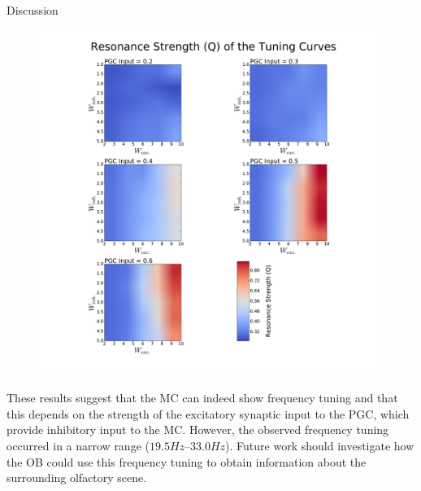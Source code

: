 \documentclass[final,hyperref={pdfpagelabels=false}]{beamer}
\begin{document}
\begin{frame}{}
\begin{columns}[t]
\begin{column}{.48\linewidth}
\begin{block}{Discussion}
\begin{figure}
\center
\includegraphics[scale=0.5]{images/Contour_plot_tuning_strength}
\end{figure} 
These results suggest that the MC can indeed show frequency tuning and that this depends on the strength of the excitatory synaptic input to the PGC, which provide inhibitory input to the MC.
However, the observed frequency tuning occurred in a narrow range ($19.5Hz – 33.0Hz$).
Future work should investigate how the OB could use this frequency tuning to obtain information about the surrounding olfactory scene.
\end{block}

\end{column}
\end{columns}
\end{frame}
\end{document}
